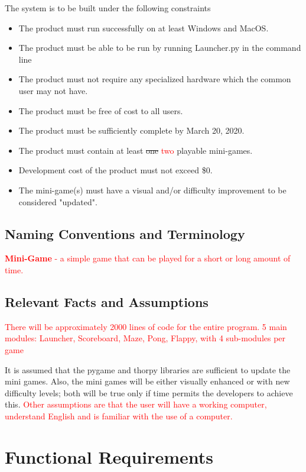 \documentclass[12pt, titlepage]{article}
\begin{document}
The system is to be built under the following constraints

\begin{itemize}
    \item The product must run successfully on at least Windows and MacOS.
    \item The product must be able to be run by running Launcher.py in the command line
    \item The product must not require any specialized hardware which the common user may not have.
    \item The product must be free of cost to all users.
    \item The product must be sufficiently complete by March 20, 2020.
    \item The product must contain at least \sout{one} \textcolor{red}{two} playable mini-games.
    \item Development cost of the product must not exceed \$0.
    \item The mini-game(s) must have a visual and/or difficulty improvement to be considered "updated".
\end{itemize}

\subsection{Naming Conventions and Terminology}

\textcolor{red}{\textbf{Mini-Game} - a simple game that can be played for a short or long amount of time.}

\subsection{Relevant Facts and Assumptions}

\textcolor{red}{There will be approximately 2000 lines of code for the entire program. 5 main modules: Launcher, Scoreboard, Maze, Pong, Flappy, with 4 sub-modules per game}

It is assumed that the pygame and thorpy libraries are sufficient to update the mini games. Also, the mini games will be either visually enhanced or with new difficulty levels; both will be true only if time permits the developers to achieve this. \textcolor{red}{Other assumptions are that the user will have a working computer, understand English and is familiar with the use of a computer.}

\section{Functional Requirements}
\end{document}
